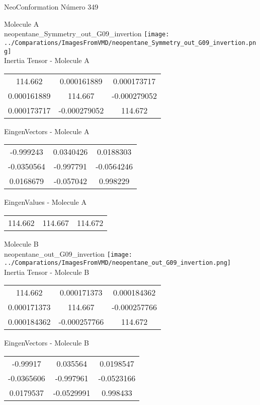 \vtab[-2cm]
\begin{center}
{\large NeoConformation \tab Número 349}
\end{center}
\begin{multicols}{2}
\begin{center}

Molecule A \\ 
neopentane\_Symmetry\_out\_G09\_invertion
\texttt{[image: ../Comparations/ImagesFromVMD/neopentane\_Symmetry\_out\_G09\_invertion.png]}
\\
Inertia Tensor - Molecule A \\
\vtab

\begin{tabular}{|c c c|}
114.662	 & 	0.000161889	 & 	0.000173717	 \\
0.000161889	 & 	114.667	 & 	-0.000279052	 \\
0.000173717	 & 	-0.000279052	 & 	114.672
\end{tabular}

\vtab
 EingenVectors - Molecule A     \\
\vtab
\begin{tabular}{|c c c|}
-0.999243	 & 	0.0340426	 & 	0.0188303	 \\
-0.0350564	 & 	-0.997791	 & 	-0.0564246	 \\
0.0168679	 & 	-0.057042	 & 	0.998229
\end{tabular}

\vtab
 EingenValues - Molecule A     \\
\vtab
\begin{tabular}{|c c c|}
114.662	 & 	114.667	 & 	114.672	 \\
\end{tabular}
\columnbreak

Molecule B \\ 
neopentane\_out\_G09\_invertion
\texttt{[image: ../Comparations/ImagesFromVMD/neopentane\_out\_G09\_invertion.png]}
\\
Inertia Tensor - Molecule B \\
\vtab

\begin{tabular}{|c c c|}
114.662	 & 	0.000171373	 & 	0.000184362	 \\
0.000171373	 & 	114.667	 & 	-0.000257766	 \\
0.000184362	 & 	-0.000257766	 & 	114.672
\end{tabular}

\vtab
 EingenVectors - Molecule B     \\
\vtab
\begin{tabular}{|c c c|}
-0.99917	 & 	0.035564	 & 	0.0198547	 \\
-0.0365606	 & 	-0.997961	 & 	-0.0523166	 \\
0.0179537	 & 	-0.0529991	 & 	0.998433
\end{tabular}


\end{center}
\end{multicols}
